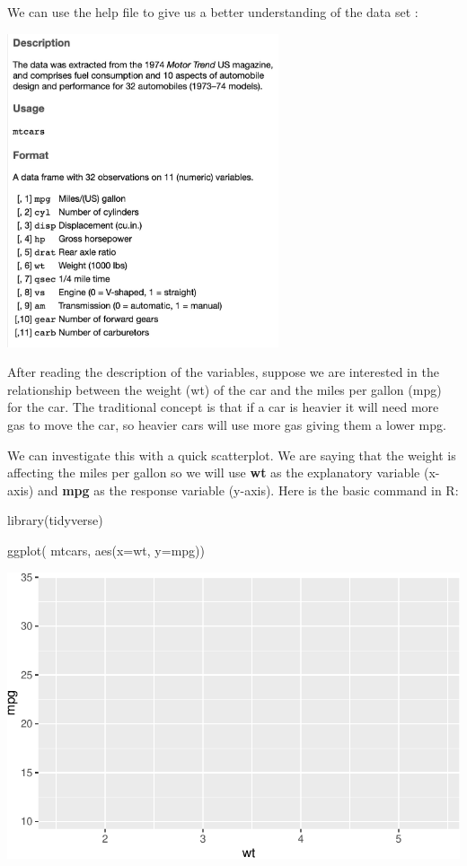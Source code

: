 \documentclass[
  letterpaper,
  DIV=11,
  numbers=noendperiod]{scrreprt}
\newenvironment{Shaded}{\begin{snugshade}}{\end{snugshade}}
\newcommand{\AttributeTok}[1]{\textcolor[rgb]{0.40,0.45,0.13}{#1}}
\newcommand{\FunctionTok}[1]{\textcolor[rgb]{0.28,0.35,0.67}{#1}}
\newcommand{\NormalTok}[1]{\textcolor[rgb]{0.00,0.23,0.31}{#1}}
\begin{document}
We can use the help file to give us a better understanding of the data
set :

\includegraphics[width=0.6\textwidth,height=\textheight]{./images/AST_1.jpg}

After reading the description of the variables, suppose we are
interested in the relationship between the weight (wt) of the car and
the miles per gallon (mpg) for the car. The traditional concept is that
if a car is heavier it will need more gas to move the car, so heavier
cars will use more gas giving them a lower mpg.

We can investigate this with a quick scatterplot. We are saying that the
weight is affecting the miles per gallon so we will use \textbf{wt} as
the explanatory variable (x-axis) and \textbf{mpg} as the response
variable (y-axis). Here is the basic command in R:

\begin{Shaded}
\begin{Highlighting}[]
\FunctionTok{library}\NormalTok{(tidyverse)}

\FunctionTok{ggplot}\NormalTok{( mtcars, }\FunctionTok{aes}\NormalTok{(}\AttributeTok{x=}\NormalTok{wt, }\AttributeTok{y=}\NormalTok{mpg))}
\end{Highlighting}
\end{Shaded}

\includegraphics{Advanced_Scatterplot_Techniques_files/figure-pdf/unnamed-chunk-2-1.pdf}
\end{document}
